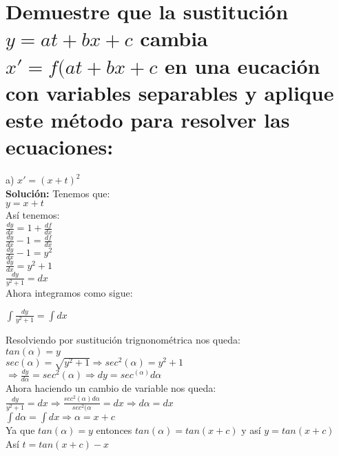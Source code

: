 \section{Demuestre que la sustitución $y=at+ bx+c$ cambia $x'=f(at+ bx+c$ en una eucación con variables separables y aplique este método para resolver las ecuaciones:}

a) $x'= (x+ t)^2$\\

\textbf{Solución:} Tenemos que:\\

$y= x+ t$\\

Así tenemos:\\

$\frac{dy}{dx}= 1 + \frac{df}{dx}$\\

$\frac{dy}{dx}-1= \frac{df}{dx}$\\

$\frac{dy}{dx}-1=y^2$\\

$\frac{dy}{dx}= y^2 +1$\\

$\frac{dy}{y^2 +1}= dx$\\

Ahora integramos como sigue:\\

\begin{center}
    $\int \frac{dy}{y^2 +1}= \int dx $
\end{center}

Resolviendo por sustitución trignonométrica nos queda:\\

$tan (\alpha)= y$\\

$sec(\alpha)= \sqrt{y^2 +1} \Rightarrow  sec^2(\alpha)= y^2 +1$\\

$\Rightarrow \frac{dy}{d\alpha}= sec^2(\alpha) \Rightarrow dy= sec^(\alpha) d\alpha$\\

Ahora haciendo un cambio de variable nos queda:\\

$\frac{dy}{y^2 +1 }= dx \Rightarrow \frac{sec^2(\alpha) d\alpha}{sec^2(\alpha}= dx \Rightarrow d\alpha= dx $ \\

$\int d \alpha = \int dx \Rightarrow \alpha = x + c$\\

Ya que $tan(\alpha)= y$ entonces $tan(\alpha)= tan(x+ c)$ y así $y = tan(x+c)$\\

Así $t= tan(x+ c)-x$








